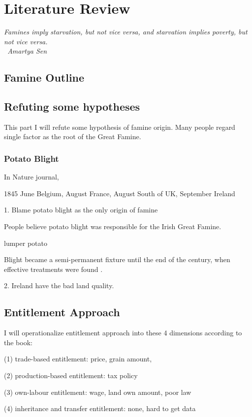 \chapter{Literature Review}

\vspace{.3cm}

\textit{Famines imply starvation, but not vice versa, and starvation implies poverty, but not vice versa.\\
\textemdash\ Amartya Sen}

\section{Famine Outline}

\section{Refuting some hypotheses}

This part I will refute some hypothesis of famine origin. Many people regard single factor as the root of the Great Famine.

\subsection{Potato Blight}

In Nature journal,

1845 June Belgium, August France, August South of UK, September Ireland





1. Blame potato blight as the only origin of famine

People believe potato blight was responsible for the Irish Great Famine. 

lumper potato

Blight became a semi-permanent fixture until the end of the century, when effective treatments were found \citep{o1994economic}.

2. Ireland have the bad land quality.

\section{Entitlement Approach}

I will operationalize entitlement approach into these 4 dimensions according to the book:

(1) trade-based entitlement: price, grain amount, 

(2) production-based entitlement: tax policy

(3) own-labour entitlement: wage, land own amount, poor law

(4) inheritance and transfer entitlement: none, hard to get data



